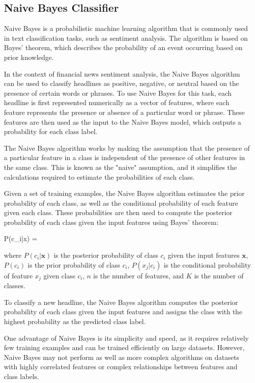 \documentclass{article}
\begin{document}
\subsection{Naive Bayes Classifier}

Naive Bayes is a probabilistic machine learning algorithm that is commonly used in text classification tasks, such as sentiment analysis. The algorithm is based on Bayes' theorem, which describes the probability of an event occurring based on prior knowledge.

In the context of financial news sentiment analysis, the Naive Bayes algorithm can be used to classify headlines as positive, negative, or neutral based on the presence of certain words or phrases. To use Naive Bayes for this task, each headline is first represented numerically as a vector of features, where each feature represents the presence or absence of a particular word or phrase. These features are then used as the input to the Naive Bayes model, which outputs a probability for each class label.

The Naive Bayes algorithm works by making the assumption that the presence of a particular feature in a class is independent of the presence of other features in the same class. This is known as the "naive" assumption, and it simplifies the calculations required to estimate the probabilities of each class.

Given a set of training examples, the Naive Bayes algorithm estimates the prior probability of each class, as well as the conditional probability of each feature given each class. These probabilities are then used to compute the posterior probability of each class given the input features using Bayes' theorem:

P(c_i|x) = 


where $P(c_i|\mathbf{x})$ is the posterior probability of class $c_i$ given the input features $\mathbf{x}$, $P(c_i)$ is the prior probability of class $c_i$, $P(x_j|c_i)$ is the conditional probability of feature $x_j$ given class $c_i$, $n$ is the number of features, and $K$ is the number of classes.

To classify a new headline, the Naive Bayes algorithm computes the posterior probability of each class given the input features and assigns the class with the highest probability as the predicted class label.

One advantage of Naive Bayes is its simplicity and speed, as it requires relatively few training examples and can be trained efficiently on large datasets. However, Naive Bayes may not perform as well as more complex algorithms on datasets with highly correlated features or complex relationships between features and class labels.
\end{document}
